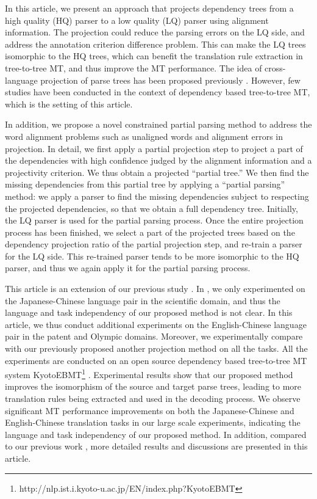 \documentclass[english]{jnlp_1.4}
\begin{document}
In this article, we present an approach that projects dependency trees from a high 
quality (HQ) parser to a low quality (LQ) parser using alignment information.
The projection could reduce the parsing errors on the LQ side, and address the 
annotation criterion difference problem. This can make the LQ trees isomorphic to 
the HQ trees, which can benefit the translation rule extraction in tree-to-tree MT,
and thus improve the MT performance. The idea of cross-language projection of parse trees 
has been proposed previously 
\cite{hwa2005bootstrapping,ganchev-gillenwater-taskar:2009:ACLIJCNLP,jiang-EtAl:2010:POSTERS,Goto:2015:PUT:2791399.2699925}.
However, few studies have been conducted in the context of dependency based tree-to-tree MT, 
which is the setting of this article. 

In addition, we propose a novel constrained partial parsing method to address the word alignment 
problems such as unaligned words and alignment errors in projection. In detail, we first apply a 
partial projection step to project a part of the dependencies with high confidence judged by the 
alignment information and a projectivity criterion.
We thus obtain a projected ``partial tree.'' We then find the missing dependencies from this 
partial tree by applying a ``partial parsing'' method: we apply a parser to find the missing 
dependencies subject to respecting the projected dependencies, so that we obtain a full dependency tree. 
Initially, the LQ parser is used for the partial parsing process. Once the entire projection process has
been finished, we select a part of the projected trees based on the dependency projection ratio 
of the partial projection step, and re-train a parser for the LQ side. This re-trained parser tends 
to be more isomorphic to the HQ parser, and thus we again apply it for the partial parsing process.

This article is an extension of our previous study \cite{shen-EtAl:2016:WMT}. In \cite{shen-EtAl:2016:WMT},
we only experimented on the Japanese-Chinese language pair in the scientific domain, and thus
the language and task independency of our proposed method is not clear. In this article, we
thus conduct additional experiments on the English-Chinese language pair in the patent and {Olympic domains.
Moreover, we experimentally compare with our previously proposed another projection method \cite{Shen2015a}
on all the tasks.} All the experiments are conducted on an open source dependency based tree-to-tree MT system 
KyotoEBMT\footnote{http://nlp.ist.i.kyoto-u.ac.jp/EN/index.php?KyotoEBMT}
\cite{richardson-EtAl:2015:WAT}. Experimental results show that our proposed method improves 
the isomorphism of the source and target parse trees, leading to more translation rules being 
extracted and used in the decoding process. We observe significant MT performance 
improvements on 
both the Japanese-Chinese and English-Chinese
translation tasks in our {large scale} experiments, indicating the language and task independency of our proposed
method. In addition, compared to our previous work \cite{shen-EtAl:2016:WMT},
more detailed results and discussions are presented in this article.
\end{document}
